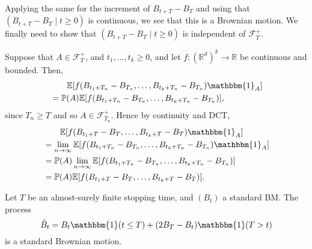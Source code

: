 \documentclass[12pt]{article}
\begin{document}
\begin{proofbox}
	Applying the same for the increment of $B_{t + T} - B_T$ and using that $(B_{t + T} - B_T \mid t \geq0)$ is continuous, we see that this is a Brownian motion. We finally need to show that $(B_{t + T} - B_T \mid t \geq 0)$ is independent of $\mathcal{F}_T^{+}$.

	Suppose that $A \in \mathcal{F}_T^{+}$, and $t_1, \ldots, t_k \geq 0$, and let $f : (\mathbb{R}^d)^{k} \to \mathbb{R}$ be continuous and bounded. Then,
	\begin{align*}
		& \qquad \mathbb{E}[f(B_{t_1 + T_n} - B_{T_n}, \ldots, B_{t_k + T_n} - B_{T_n}) \mathbbm{1}_{A}] \\
		&= \mathbb{P}(A) \mathbb{E}[f(B_{t_1+T_n} - B_{T_n}, \ldots, B_{t_k + T_n} - B_{T_n})],
	\end{align*}
	since $T_n \geq T$ and so $A \in \mathcal{F}_{T_n}^{+}$. Hence by continuity and DCT,
	\begin{align*}
		& \qquad \mathbb{E}[f(B_{t_1 + T} - B_{T}, \ldots, B_{t_k + T} - B_{T}) \mathbbm{1}_{A}] \\
		&= \lim_{n \to \infty} \mathbb{E}[f(B_{t_1+T_n} - B_{T_n}, \ldots, B_{t_k + T_n} - B_{T_n}) \mathbbm{1}_{A}] \\
		&= \mathbb{P}(A) \lim_{n \to \infty} \mathbb{E}[f(B_{t_1 + T_n} - B_{T_n}, \ldots, B_{t_k + T_n} - B_{T_n})] \\
		&= \mathbb{P}(A) \mathbb{E}[f(B_{t_1+T} - B_{T}, \ldots, B_{t_k + T} - B_{T})].
	\end{align*}
\end{proofbox}

\begin{theorem}
	Let $T$ be an almost-surely finite stopping time, and $(B_t)$ a standard BM. The process
	\[
	\tilde B_t = B_t \mathbbm{1}(t \leq T) + (2 B_T - B_t) \mathbbm{1}(T > t)
	\]
	is a standard Brownian motion.
\end{theorem}
\end{document}

